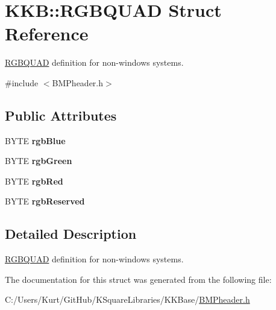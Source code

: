 \hypertarget{struct_k_k_b_1_1_r_g_b_q_u_a_d}{}\section{K\+KB\+:\+:R\+G\+B\+Q\+U\+AD Struct Reference}
\label{struct_k_k_b_1_1_r_g_b_q_u_a_d}


\hyperlink{struct_k_k_b_1_1_r_g_b_q_u_a_d}{R\+G\+B\+Q\+U\+AD} definition for non-\/windows systems.  




{\ttfamily \#include $<$B\+M\+Pheader.\+h$>$}

\subsection*{Public Attributes}
\begin{DoxyCompactItemize}
\item 
B\+Y\+TE {\bfseries rgb\+Blue}\hypertarget{struct_k_k_b_1_1_r_g_b_q_u_a_d_ace7bae0113005a4d51fee290b7a7d21b}{}\label{struct_k_k_b_1_1_r_g_b_q_u_a_d_ace7bae0113005a4d51fee290b7a7d21b}

\item 
B\+Y\+TE {\bfseries rgb\+Green}\hypertarget{struct_k_k_b_1_1_r_g_b_q_u_a_d_a211402c8b6890dc9bf6f16e0dc924451}{}\label{struct_k_k_b_1_1_r_g_b_q_u_a_d_a211402c8b6890dc9bf6f16e0dc924451}

\item 
B\+Y\+TE {\bfseries rgb\+Red}\hypertarget{struct_k_k_b_1_1_r_g_b_q_u_a_d_a8f9a33618e9878f82f20e372fb8f48e1}{}\label{struct_k_k_b_1_1_r_g_b_q_u_a_d_a8f9a33618e9878f82f20e372fb8f48e1}

\item 
B\+Y\+TE {\bfseries rgb\+Reserved}\hypertarget{struct_k_k_b_1_1_r_g_b_q_u_a_d_af5424bce175d4d97b4235cbceb7d62d3}{}\label{struct_k_k_b_1_1_r_g_b_q_u_a_d_af5424bce175d4d97b4235cbceb7d62d3}

\end{DoxyCompactItemize}


\subsection{Detailed Description}
\hyperlink{struct_k_k_b_1_1_r_g_b_q_u_a_d}{R\+G\+B\+Q\+U\+AD} definition for non-\/windows systems. 

The documentation for this struct was generated from the following file\+:\begin{DoxyCompactItemize}
\item 
C\+:/\+Users/\+Kurt/\+Git\+Hub/\+K\+Square\+Libraries/\+K\+K\+Base/\hyperlink{_b_m_pheader_8h}{B\+M\+Pheader.\+h}\end{DoxyCompactItemize}
